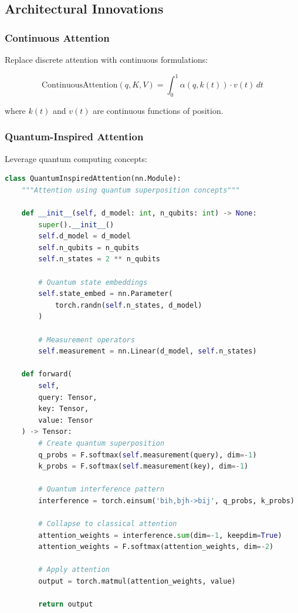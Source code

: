 \subsection{Architectural Innovations}

\subsubsection{Continuous Attention}

Replace discrete attention with continuous formulations:

\begin{equation}
\text{ContinuousAttention}(q, K, V) = \int_{0}^{1} \alpha(q, k(t)) \cdot v(t) \, dt
\end{equation}

where $k(t)$ and $v(t)$ are continuous functions of position.

\subsubsection{Quantum-Inspired Attention}

Leverage quantum computing concepts:

\begin{lstlisting}[language=Python, caption=Quantum-Inspired Attention Concept]
class QuantumInspiredAttention(nn.Module):
    """Attention using quantum superposition concepts"""

    def __init__(self, d_model: int, n_qubits: int) -> None:
        super().__init__()
        self.d_model = d_model
        self.n_qubits = n_qubits
        self.n_states = 2 ** n_qubits

        # Quantum state embeddings
        self.state_embed = nn.Parameter(
            torch.randn(self.n_states, d_model)
        )

        # Measurement operators
        self.measurement = nn.Linear(d_model, self.n_states)

    def forward(
        self,
        query: Tensor,
        key: Tensor,
        value: Tensor
    ) -> Tensor:
        # Create quantum superposition
        q_probs = F.softmax(self.measurement(query), dim=-1)
        k_probs = F.softmax(self.measurement(key), dim=-1)

        # Quantum interference pattern
        interference = torch.einsum('bih,bjh->bij', q_probs, k_probs)

        # Collapse to classical attention
        attention_weights = interference.sum(dim=-1, keepdim=True)
        attention_weights = F.softmax(attention_weights, dim=-2)

        # Apply attention
        output = torch.matmul(attention_weights, value)

        return output
\end{lstlisting}
